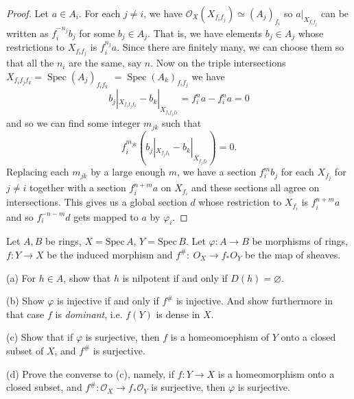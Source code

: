 \begin{proof}
	Let $a \in A_{i} .$ For each $j \neq i$, we have $\mathcal{O}_{X}\left(X_{f_{i} f_{j}}\right) \simeq\left(A_{j}\right)_{f_{i}}$ so $a|_{X_{f_{i} f_{j}}}$ can be written as $f_{i}^{-n_{j}}b_j$ for some $b_{j} \in A_{j} .$ That is, we have elements $b_{j} \in A_{j}$ whose restrictions to $X_{f_{i} f_{j}}$ is $f_{i}^{n_{j}} a$. Since there are finitely many, we can choose them so that all the $n_{i}$ are the same, say $n .$ Now on the triple intersections $X_{f_{i} f_{j} f_{k}}=\operatorname{Spec}\left(A_{j}\right)_{f_{i} f_{k}}$ $=\operatorname{Spec}\left(A_{k}\right)_{f_{i} f_{j}}$ we have $$b_{j}|_{X_{f_if_jf_k}}-b_{k}|_{X_{f_if_jf_k}}=f_{i}^{n} a-f_{i}^{n} a=0$$ and so we can find some integer $m_{j k}$ such that $$f_{i}^{m_{j k}}\left(b_{j}|_{X_{f_jf_k}}-b_{k}|_{X_{f_jf_k}}\right)=0.$$ Replacing each $m_{j k}$ by a large enough $m$, we have a section $f_{i}^{m} b_{j}$ for each $X_{f_{j}}$ for $j \neq i$ together with a section $f_{i}^{n+m} a$ on $X_{f_{i}}$ and these sections all agree on intersections. This gives us a global section $d$ whose restriction to $X_{f_{i}}$ is $f_{i}^{n+m} a$ and so $f_{i}^{-n-m}d$ gets mapped to $a$ by $\varphi_{i}$.
\end{proof}
\begin{exe}
	\label{2.2.18}
	Let $A, B$ be rings, $X=\mathrm{Spec}\,A$, $Y=\mathrm{Spec}\,B$. Let $\varphi : A\rightarrow B$ be morphisms of rings, $f: Y\rightarrow X $
	be the induced morphism and $f^\#:\ O_X \rightarrow f_*O_Y$ be the map of sheaves.
	
	(a) For $h\in A$, show that $h$ is nilpotent if and only if $D(h)=\varnothing$.
	
	(b) Show $\varphi$ is injective if and only if $f^\#$ is injective. And show furthermore in that case $f$ is \emph{dominant}, i.e. $f(Y)$ is dense in $X$.
	
	(c) Show that if $\varphi$ is surjective, then $f$ is a homeomoephism of $Y$ onto a closed subset of $X$, and $f^\#$ is surjective.
	
	(d) Prove the converse to (c), namely, if $f:Y\to X$ is a homeomorphism onto a closed subset, and $f^\#:\mathcal{O}_X\to f_*\mathcal{O}_Y$ is surjective, then $\varphi$ is surjective.
\end{exe}

